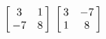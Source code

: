 {$\left[\hskip -3pt \begin{array}{cc} 3&1\\  -7&8\end {array} \hskip -3pt
 \right] $}
{$\left[\hskip -3pt \begin{array}{cc} 3&-7\\  1&8\end {array} \hskip -3pt
 \right] $
}




